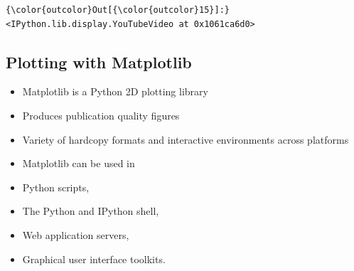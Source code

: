 \documentclass{article}
\begin{document}
            \begin{Verbatim}[commandchars=\\\{\}]
{\color{outcolor}Out[{\color{outcolor}15}]:} <IPython.lib.display.YouTubeVideo at 0x1061ca6d0>
\end{Verbatim}
        
    \subsection{Plotting with Matplotlib}

\begin{itemize}
\itemsep1pt\parskip0pt
\item
  Matplotlib is a Python 2D plotting library
\item
  Produces publication quality figures
\item
  Variety of hardcopy formats and interactive environments across
  platforms
\item
  Matplotlib can be used in
\item
  Python scripts,
\item
  The Python and IPython shell,
\item
  Web application servers,
\item
  Graphical user interface toolkits.
\end{itemize}
\end{document}
